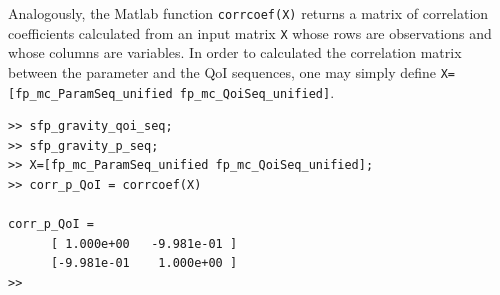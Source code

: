 Analogously, the Matlab function \verb+corrcoef(X)+ returns a matrix of correlation coefficients calculated from an input matrix \verb+X+ whose rows are observations and whose columns are variables.
In order to calculated the correlation matrix between the parameter and the QoI sequences, one may simply define \verb+X=[fp_mc_ParamSeq_unified fp_mc_QoiSeq_unified]+.

\begin{lstlisting}[label=matlab:corr_param_qoi,caption={Matlab code for the matrix of correlation between parameter $g$ and quantity of interest $d$.}]
% inside Matlab
>> sfp_gravity_qoi_seq;
>> sfp_gravity_p_seq;
>> X=[fp_mc_ParamSeq_unified fp_mc_QoiSeq_unified];
>> corr_p_QoI = corrcoef(X)

corr_p_QoI =
	  [ 1.000e+00 	-9.981e-01 ] 
	  [-9.981e-01 	 1.000e+00 ]
>>
\end{lstlisting}


